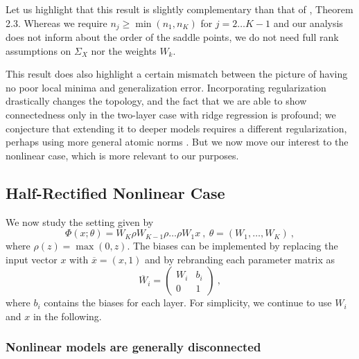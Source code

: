 Let us highlight that this result is slightly complementary than that of \cite{kawaguchi2016deep}, Theorem 2.3.
Whereas we require $n_j \geq \min(n_1, n_K)$ for $j=2 \dots K-1$ and our analysis does not inform about the order of the saddle points, 
we do not need full rank assumptions on $\Sigma_X$ nor the weights $W_k$. %

This result does also highlight a certain mismatch between the picture of having no poor local minima 
and generalization error. Incorporating regularization drastically changes the topology, and the 
fact that we are able to show connectedness only in the two-layer case with ridge regression is profound; we conjecture that extending it to deeper models requires a different regularization, perhaps using more general atomic norms \cite{bach2013convex}. But we now move our interest to the nonlinear case, which is more relevant to our purposes. 

\subsection{Half-Rectified Nonlinear Case}

We now study the setting given by 
\begin{equation}
\label{relucase}
\Phi(x;\theta) = W_K \rho W_{K-1} \rho \dots \rho W_1 x~,~\theta = (W_1, \dots, W_K)~,
\end{equation}
where $\rho(z) = \max(0 ,z)$. 
The biases can be implemented by replacing the input vector $x$ 
with $\overline{x}=(x, 1)$ and by rebranding each parameter matrix as 
$$\overline{W}_i = \left( 
\begin{array}{c|c}
W_i & b_i \\
\hline 
0 & 1 
\end{array}
\right)~,$$
where $b_i$ contains the biases for each layer.	
For simplicity, we continue to use $W_i$ and $x$ in the following.

\subsubsection{Nonlinear models are generally disconnected}
\label{disconnect}

